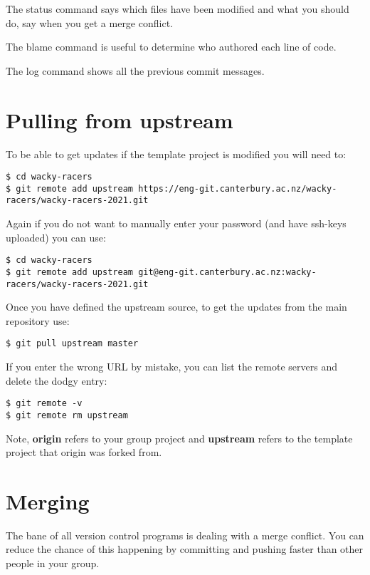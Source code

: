 The status command says which files have been modified and what you
should do, say when you get a merge conflict.

The blame command is useful to determine who authored each line of code.

The log command shows all the previous commit messages.


\section{Pulling from upstream}
\label{git-pulling-from-upstream}

To be able to get updates if the template project is modified you will
need to:

\begin{verbatim}
$ cd wacky-racers
$ git remote add upstream https://eng-git.canterbury.ac.nz/wacky-racers/wacky-racers-2021.git
\end{verbatim}

Again if you do not want to manually enter your password (and have
ssh-keys uploaded) you can use:
%
\begin{verbatim}
$ cd wacky-racers
$ git remote add upstream git@eng-git.canterbury.ac.nz:wacky-racers/wacky-racers-2021.git
\end{verbatim}

Once you have defined the upstream source, to get the updates from the
main repository use:
%
\begin{verbatim}
$ git pull upstream master
\end{verbatim}

If you enter the wrong URL by mistake, you can list the remote servers
and delete the dodgy entry:

\begin{verbatim}
$ git remote -v
$ git remote rm upstream
\end{verbatim}

Note, \textbf{origin} refers to your group project and \textbf{upstream}
refers to the template project that origin was forked from.

\section{Merging}
\label{git-merging}

The bane of all version control programs is dealing with a merge
conflict. You can reduce the chance of this happening by committing and
pushing faster than other people in your group.

